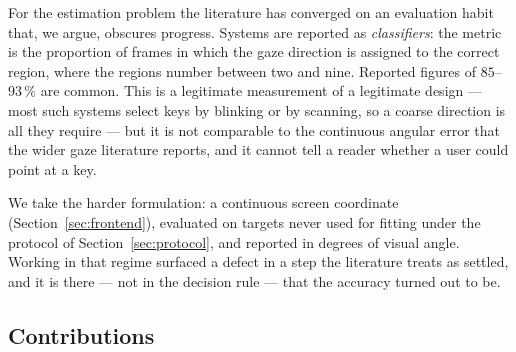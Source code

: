 \documentclass[conference]{IEEEtran}
\begin{document}
For the estimation problem the literature has converged on an evaluation habit
that, we argue, obscures progress. Systems are reported as \emph{classifiers}:
the metric is the proportion of frames in which the gaze direction is assigned to
the correct region, where the regions number between two and nine. Reported
figures of $85$--$93\,\%$ are common. This is a legitimate measurement of a
legitimate design --- most such systems select keys by blinking or by scanning,
so a coarse direction is all they require --- but it is not comparable to the
continuous angular error that the wider gaze literature reports, and it cannot
tell a reader whether a user could point at a key.

We take the harder formulation: a continuous screen coordinate
(Section~\ref{sec:frontend}), evaluated on targets never used for fitting under
the protocol of Section~\ref{sec:protocol}, and reported in degrees of visual
angle. Working in
that regime surfaced a defect in a step the literature treats as settled, and it
is there --- not in the decision rule --- that the accuracy turned out to be.

\subsection{Contributions}
\end{document}
